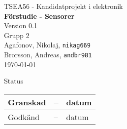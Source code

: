 \documentclass[11pt]{article}
\date{}
\begin{document}
\begin{titlepage}
\begin{center}
TSEA56 - Kandidatprojekt i elektronik \\[0.5in]
{\Large\bfseries Förstudie - Sensorer }\\
%
\vspace{4\baselineskip}
%
Version 0.1\\
\vspace{2\baselineskip}
%
Grupp 2 \\
Agafonov, Nikolaj, 
\texttt{nikag669}
\\
Brorsson, Andreas, 
\texttt{andbr981}
\\


\vspace{2\baselineskip}
\today

\vspace{23\baselineskip}
Status
\begin{table}[b]
\centering
\begin{tabular}{|l|l|l|} \hline
 Granskad & -- & datum  \\ \hline
 Godkänd  & -- & datum \\ \hline 
\end{tabular}
\end{table}

\end{center}
\end{titlepage}
\end{document}

